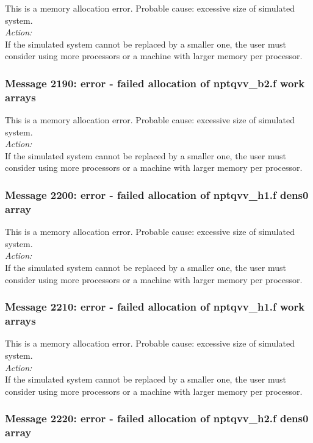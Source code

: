 This is a memory allocation error. Probable cause: excessive size of
simulated system. \\

\noindent
{\em Action:}\\
If the simulated system cannot be replaced by a smaller one, the user
must consider using more processors or a machine with larger memory
per processor.

\subsubsection*{Message 2190: error - failed allocation of nptqvv\_b2.f
work arrays}

This is a memory allocation error. Probable cause: excessive size of
simulated system. \\

\noindent
{\em Action:}\\
If the simulated system cannot be replaced by a smaller one, the user
must consider using more processors or a machine with larger memory
per processor.

\subsubsection*{Message 2200: error - failed allocation of nptqvv\_h1.f
dens0 array}

This is a memory allocation error. Probable cause: excessive size of
simulated system. \\

\noindent
{\em Action:}\\
If the simulated system cannot be replaced by a smaller one, the user
must consider using more processors or a machine with larger memory
per processor.

\subsubsection*{Message 2210: error - failed allocation of nptqvv\_h1.f
work arrays}

This is a memory allocation error. Probable cause: excessive size of
simulated system. \\

\noindent
{\em Action:}\\
If the simulated system cannot be replaced by a smaller one, the user
must consider using more processors or a machine with larger memory
per processor.

\subsubsection*{Message 2220: error - failed allocation of nptqvv\_h2.f
dens0 array}

